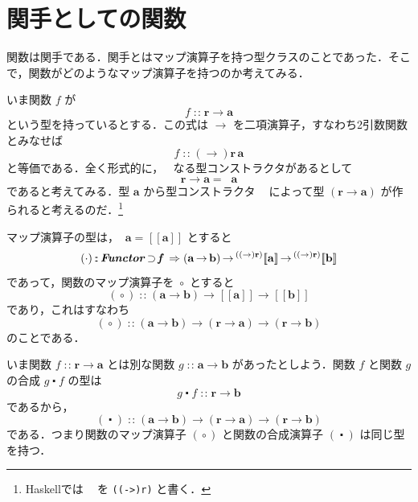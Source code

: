 \documentclass[a5paper,twoside,fleqn,draft]{jsbook}
\def\[{[\![}
\def\]{]\!]}
\newcommand{\programminglanguage}[1]{\textsf{#1}}
\newcommand{\haskell}{\programminglanguage{Haskell}}
\newcommand{\code}[1]{\texttt{#1}}
\DeclareMathOperator{\mSuperClass}{\;\Rightarrow\;}
\DeclareMathOperator{\mSuperSet}{\supset}
\DeclareMathOperator{\mCompFunc}{\centerdot}
\DeclareMathOperator{\mFuncArrow}{\rightarrow}
\DeclareMathOperator{\mIn}{{:\!:}}
\DeclareMathOperator{\mMap}{\cdot}
\DeclareMathOperator{\mMapFunc}{\circ}
\newcommand{\mType}[1]{\mathbf{#1}} %
\newcommand{\mPolymorphicTypeParameter}[1]{\textbf{\textit{#1}}}
\newcommand{\mA}{\mType{a}}
\newcommand{\mB}{\mType{b}}
\newcommand{\mR}{\mType{r}}
\newcommand{\mTypeAssemble}[2]{{}^\mathrm{#1}\[\mType{#2}\]}
\newcommand{\mPolymorphicTypeAssemble}[2]{{}^\mPolymorphicTypeParameter{#1}\[\mType{#2}\]}
\DeclareMathOperator{\mFuncTypeConstructor}{((\rightarrow)\mType{r})}
\newcommand{\mFuncType}[1]{\mTypeAssemble{\mFuncTypeConstructor}{#1}}
\newcommand{\mTypeClass}[1]{\textbf{\textit{#1}}}
\newcommand{\mFunctorTypeClass}{\mTypeClass{Functor}}
\newcommand{\mProjEXP}[2]{#1\mFuncArrow#2} %
\begin{document}
\section{関手としての関数}

関数は関手である．関手とはマップ演算子を持つ型クラスのことであった．そこで，関数がどのようなマップ演算子を持つのか考えてみる．

いま関数 $f$ が
\begin{equation}
  f
  \mIn\mR\mFuncArrow\mA
\end{equation}
という型を持っているとする．この式は $\mFuncArrow$ を二項演算子，すなわち2引数関数とみなせば
\begin{equation}
  f
  \mIn(\mFuncArrow)\mR\,\mA
\end{equation}
と等価である．全く形式的に，$\mFuncTypeConstructor$ なる型コンストラクタがあるとして
\begin{equation}
  \mR\mFuncArrow\mA=\mFuncTypeConstructor\mA
\end{equation}
であると考えてみる．型 $\mA$ から型コンストラクタ $\mFuncTypeConstructor$ によって型 $(\mProjEXP{\mR}{\mA})$ が作られると考えるのだ．\footnote{\haskell では $\mFuncTypeConstructor$ を \code{((->)r)} と書く．}

マップ演算子の型は，$\mFuncTypeConstructor\mA=\mFuncType{a}$ とすると
\begin{equation}
  (\mMap)
  \mIn{}\mFunctorTypeClass\mSuperSet\mPolymorphicTypeParameter{f}
  \mSuperClass(\mA\mFuncArrow\mB)
  \mFuncArrow\mFuncType{a}
  \mFuncArrow\mFuncType{b}
\end{equation}
であって，関数のマップ演算子を $\mMapFunc$ とすると
\begin{equation}
  (\mMapFunc)
  \mIn{}(\mA\mFuncArrow\mB)
  \mFuncArrow\mFuncType{a}
  \mFuncArrow\mFuncType{b}
\end{equation}
であり，これはすなわち
\begin{equation}
  (\mMapFunc)
  \mIn{}(\mA\mFuncArrow\mB)
  \mFuncArrow(\mR\mFuncArrow\mA)
  \mFuncArrow(\mR\mFuncArrow\mB)
\end{equation}
のことである．

いま関数 $f\mIn\mProjEXP{\mR}{\mA }$ とは別な関数 $g\mIn\mProjEXP{\mA }{\mB }$ があったとしよう．関数 $f$ と関数 $g$ の合成 $g\mCompFunc f$ の型は
\begin{equation}
g\mCompFunc f\mIn\mProjEXP{\mR}{\mB }
\end{equation}
であるから，
\begin{equation}
(\mCompFunc)\mIn{}\mProjEXP{\mProjEXP{(\mProjEXP{\mA }{\mB })}{(\mProjEXP{\mR}{\mA })}}
  {(\mProjEXP{\mR}{\mB })}
\end{equation}
である．つまり関数のマップ演算子 $(\mMapFunc)$ と関数の合成演算子 $(\mCompFunc)$ は同じ型を持つ．
\end{document}
